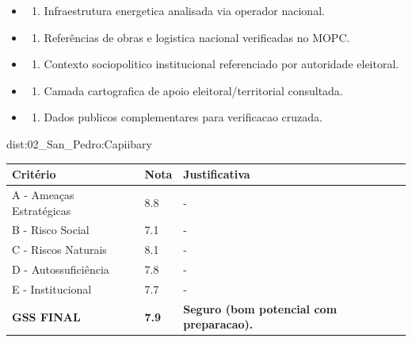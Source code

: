 {\begin{itemize}
\item
  \begin{enumerate}
  \def\labelenumi{\arabic{enumi})}
  \setcounter{enumi}{7}
  \tightlist
  \item
    Infraestrutura energetica analisada via operador nacional.
  \end{enumerate}
\item
  \begin{enumerate}
  \def\labelenumi{\arabic{enumi})}
  \setcounter{enumi}{8}
  \tightlist
  \item
    Referências de obras e logistica nacional verificadas no MOPC.
  \end{enumerate}
\item
  \begin{enumerate}
  \def\labelenumi{\arabic{enumi})}
  \setcounter{enumi}{9}
  \tightlist
  \item
    Contexto sociopolitico institucional referenciado por autoridade
    eleitoral.
  \end{enumerate}
\item
  \begin{enumerate}
  \def\labelenumi{\arabic{enumi})}
  \setcounter{enumi}{10}
  \tightlist
  \item
    Camada cartografica de apoio eleitoral/\allowbreak territorial consultada.
  \end{enumerate}
\item
  \begin{enumerate}
  \def\labelenumi{\arabic{enumi})}
  \setcounter{enumi}{11}
  \tightlist
  \item
    Dados publicos complementares para verificacao cruzada.
  \end{enumerate}
\end{itemize}}{dist:02_San_Pedro:Capiibary}
\begin{table}[ht!]
\small \begin{tabular}{p{3.0cm}p{0.8cm}p{6.0cm}} \toprule
\textbf{Critério} & \textbf{Nota} & \textbf{Justificativa} \\ \midrule
A - Ameaças Estratégicas & 8.8 & - \\
B - Risco Social & 7.1 & - \\
C - Riscos Naturais & 8.1 & - \\
D - Autossuficiência & 7.8 & - \\
E - Institucional & 7.7 & - \\
\midrule \textbf{GSS FINAL} & \textbf{7.9} & \textbf{Seguro (bom potencial com preparacao).} \\ \bottomrule \end{tabular}
\end{table}
